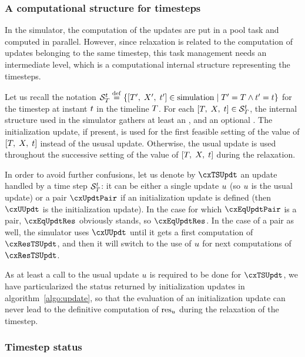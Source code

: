 \subsubsection{A computational structure for timesteps}

In the simulator, the computation of the updates are put in a pool task and computed in parallel. However, since relaxation is related to the computation of updates belonging to the same timestep, this task management needs an intermediate level, which is a computational internal structure representing the timesteps.

Let us recall the notation ${{{\cal S}}_{T}^{t}}\;{\stackrel{\mathrm{def}}{=}}\;{\left\{{\left[ T',\;X',\;t' \right]} \in {\mbox{simulation}}\; \middle| \; {{T'} = {T}} \wedge {{t'} = {t}}\right\}}$ for the timestep at instant $t$ in the timeline $T$. For each ${\left[ T,\;X,\;t \right]} \in {{{\cal S}}_{T}^{t}}$, the internal structure used in the simulator gathers at least an , and an optional . The initialization update, if present, is used for the first feasible setting of the value of $\left[ T,\;X,\;t \right]$ instead of the ususal update. Otherwise, the usual update is used throughout the successive setting of the value of $\left[ T,\;X,\;t \right]$ during the relaxation.


In order to avoid further confusions, let us denote by $\cxTSUpdt$ an update handled by a time step ${{\cal S}}_{T}^{t}$: it can be either a single update $u$ (so $u$ is the usual update) or a pair $\cxUpdtPair$ if an initialization update is defined (then $\cxUUpdt$ is the initialization update). In the case for which $\cxEqUpdtPair$ is a pair, $\cxEqUpdtRes$ obviously stands, so $\cxEqUpdtRes$. In the case of a pair as well, the simulator uses $\cxUUpdt$ until it gets a first computation of $\cxResTSUpdt$, and then it will switch to the use of $u$ for next computations of $\cxResTSUpdt$.

As at least a call to the usual update $u$ is required to be done for $\cxTSUpdt$, we have particularized the status returned by initialization updates in algorithm~\ref{algo:update}, so that the evaluation of an initialization update can never lead to the definitive computation of ${\mathrm{res}}_{u}$ during the relaxation of the timestep.



\subsubsection{Timestep status}

